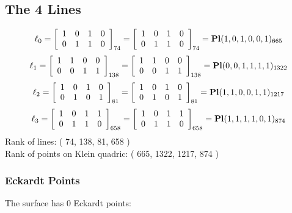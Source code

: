 \documentclass{article}
\begin{document}
{\subsection*{The 4 Lines}
$$
\ell_{0} = 
\left[
\begin{array}{*{4}{r}}
1 & 0 & 1 & 0\\
0 & 1 & 1 & 0\\
\end{array}
\right]
_{74}
=
\left[
\begin{array}{*{4}c}
1  & 0  & 1  & 0\\
0  & 1  & 1  & 0\\
\end{array}
\right]_{74}
={\rm\bf Pl}(1,0,1,0,0,1 )_{665}$$
$$
\ell_{1} = 
\left[
\begin{array}{*{4}{r}}
1 & 1 & 0 & 0\\
0 & 0 & 1 & 1\\
\end{array}
\right]
_{138}
=
\left[
\begin{array}{*{4}c}
1  & 1  & 0  & 0\\
0  & 0  & 1  & 1\\
\end{array}
\right]_{138}
={\rm\bf Pl}(0,0,1,1,1,1 )_{1322}$$
$$
\ell_{2} = 
\left[
\begin{array}{*{4}{r}}
1 & 0 & 1 & 0\\
0 & 1 & 0 & 1\\
\end{array}
\right]
_{81}
=
\left[
\begin{array}{*{4}c}
1  & 0  & 1  & 0\\
0  & 1  & 0  & 1\\
\end{array}
\right]_{81}
={\rm\bf Pl}(1,1,0,0,1,1 )_{1217}$$
$$
\ell_{3} = 
\left[
\begin{array}{*{4}{r}}
1 & 0 & 1 & 1\\
0 & 1 & 1 & 0\\
\end{array}
\right]
_{658}
=
\left[
\begin{array}{*{4}c}
1  & 0  & 1  & 1\\
0  & 1  & 1  & 0\\
\end{array}
\right]_{658}
={\rm\bf Pl}(1,1,1,1,0,1 )_{874}$$
Rank of lines: ( 74, 138, 81, 658 )\\
Rank of points on Klein quadric: ( 665, 1322, 1217, 874 )\\
\subsubsection*{Eckardt Points}
The surface has 0 Eckardt points:\\
}
\end{document}
